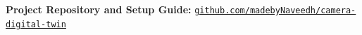 \documentclass[10pt,a4paper]{article}
\begin{document}
\vspace{1pt}

\begin{tcolorbox}[
    colback=lightblue,
    colframe=borderblue,
    boxrule=0.6pt,
    arc=1.5mm,
    left=6pt,
    right=6pt,
    top=2.5pt,
    bottom=2.5pt
]
\small
\textbf{\color{navy}Project Repository and Setup Guide:}
\href{https://github.com/madebyNaveedh/camera-digital-twin}
{\texttt{github.com/madebyNaveedh/camera-digital-twin}}
\end{tcolorbox}
\end{document}
